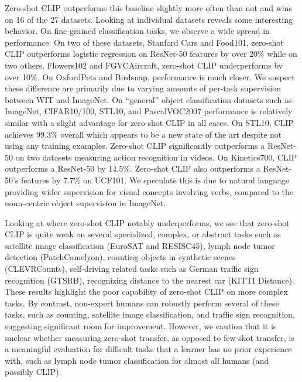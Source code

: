 Zero-shot CLIP outperforms this baseline slightly more often than not and wins on 16 of the 27 datasets. Looking at individual datasets reveals some interesting behavior. On fine-grained classification tasks, we observe a wide spread in performance. On two of these datasets, Stanford Cars and Food101, zero-shot CLIP outperforms logistic regression on ResNet-50 features by over 20\% while on two others, Flowers102 and FGVCAircraft, zero-shot CLIP underperforms by over 10\%. On OxfordPets and Birdsnap, performance is much closer. We suspect these difference are primarily due to varying amounts of per-task supervision between WIT and ImageNet. On ``general'' object classification datasets such as ImageNet, CIFAR10/100, STL10, and PascalVOC2007 performance is relatively similar with a slight advantage for zero-shot CLIP in all cases. On STL10, CLIP achieves 99.3\% overall which appears to be a new state of the art despite not using any training examples. Zero-shot CLIP significantly outperforms a ResNet-50 on two datasets measuring action recognition in videos. On Kinetics700, CLIP outperforms a ResNet-50 by 14.5\%. Zero-shot CLIP also outperforms a ResNet-50's features by 7.7\% on UCF101. We speculate this is due to natural language providing wider supervision for visual concepts involving verbs, compared to the noun-centric object supervision in ImageNet. 

Looking at where zero-shot CLIP notably underperforms, we see that zero-shot CLIP is quite weak on several specialized, complex, or abstract tasks such as satellite image classification (EuroSAT and RESISC45), lymph node tumor detection (PatchCamelyon), counting objects in synthetic scenes (CLEVRCounts), self-driving related tasks such as German traffic sign recognition (GTSRB), recognizing distance to the nearest car (KITTI Distance). These results highlight the poor capability of zero-shot CLIP on more complex tasks. By contrast, non-expert humans can robustly perform several of these tasks, such as counting, satellite image classification, and traffic sign recognition, suggesting significant room for improvement. However, we caution that it is unclear whether measuring zero-shot transfer, as opposed to few-shot transfer, is a meaningful evaluation for difficult tasks that a learner has no prior experience with, such as lymph node tumor classification for almost all humans (and possibly CLIP). 

